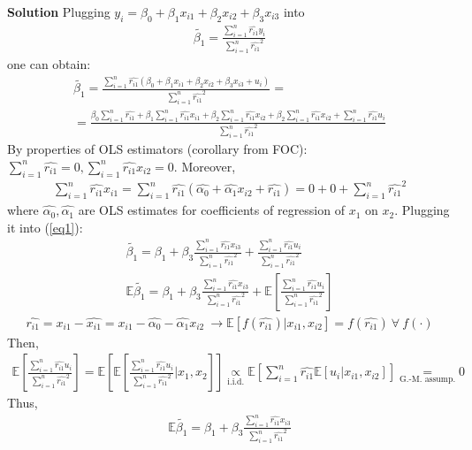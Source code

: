 \documentclass[a4paper]{article}
\newcommand{\expect}{\mathbb{E}}
\begin{document}
\textbf{Solution}
Plugging $y_i = \beta_0 + \beta_1x_{i1} + \beta_2x_{i2}+\beta_3x_{i3}$ into
\begin{align*}
\tilde{\beta_1} = \frac{\sum_{i=1}^n \hat{r_{i1}}y_i}{\sum_{i=1}^n \hat{r_{i1}}^2}
\end{align*}
one can obtain:
\begin{align} \label{eq1}
\tilde{\beta_1} = \frac{\sum_{i=1}^n \hat{r_{i1}}(\beta_0 + \beta_1x_{i1} + \beta_2x_{i2}+\beta_3x_{i3} + u_i)}{\sum_{i=1}^n \hat{r_{i1}}^2} = \nonumber \\
=\frac{\beta_0 \sum_{i=1}^n \hat{r_{i1}} + \beta_1 \sum_{i=1}^n \hat{r_{i1}}x_{i1} + \beta_2 \sum_{i=1}^n \hat{r_{i1}}x_{i2} + \beta_2 \sum_{i=1}^n \hat{r_{i1}}x_{i2} + \sum_{i=1}^n \hat{r_{i1}}u_i}{\sum_{i=1}^n \hat{r_{i1}}^2}
\end{align}
By properties of OLS estimators (corollary from FOC): $\sum_{i=1}^n \hat{r_{i1}} = 0, \sum_{i=1}^n \hat{r_{i1}}x_{i2} = 0$. Moreover,
\begin{align*}
\sum_{i=1}^n \hat{r_{i1}}x_{i1} = \sum_{i=1}^n \hat{r_{i1}} (\hat{\alpha_0} + \hat{\alpha_1}x_{i2} + \hat{r_{i1}}) = 0 + 0 + \sum_{i=1}^n \hat{r_{i1}}^2
\end{align*}
where $\hat{\alpha_0}, \hat{\alpha_1}$ are OLS estimates for coefficients of regression of $x_1$ on $x_2$. Plugging it into (\ref{eq1}):
\begin{align*}
\tilde{\beta_1} = \beta_1 + \beta_3\frac{\sum_{i=1}^n\hat{r_{i1}}x_{i3}}{\sum_{i=1}^n \hat{r_{i1}}^2} + \frac{\sum_{i=1}^n \hat{r_{i1}}u_i}{\sum_{i=1}^n \hat{r_{i1}}^2}\\
\expect \tilde{\beta_1} = \beta_1 + \beta_3\frac{\sum_{i=1}^n\hat{r_{i1}}x_{i3}}{\sum_{i=1}^n \hat{r_{i1}}^2} + \expect\left[ \frac{\sum_{i=1}^n \hat{r_{i1}}u_i}{\sum_{i=1}^n \hat{r_{i1}}^2} \right]
\end{align*}
\begin{align*}
\hat{r_{i1}} = x_{i1} - \hat{x_{i1}} = x_{i1} - \hat{\alpha_0} - \hat{\alpha_1}x_{i2}\ \to \expect[f(\hat{r_{i1}})|x_{i1}, x_{i2}] = f(\hat{r_{i1}}) \ \forall\ f(\cdot)
\end{align*}
Then,
\begin{align*}
\expect\left[\frac{\sum_{i=1}^n \hat{r_{i1}}u_i}{\sum_{i=1}^n \hat{r_{i1}}^2} \right] = \expect\left[\expect\left[\frac{\sum_{i=1}^n \hat{r_{i1}}u_i}{\sum_{i=1}^n \hat{r_{i1}}^2}\bigg|x_{1}, x_{2}\right] \right] \underset{\text{i.i.d.}}{\propto} \expect\left[\sum_{i=1}^n\hat{r_{i1}}\expect [u_i|x_{i1}, x_{i2}]\right] \underset{\text{G.-M. assump.}}{=} 0 
\end{align*}
Thus, 
\begin{align*}
\expect \tilde{\beta_1} = \beta_1 + \beta_3\frac{\sum_{i=1}^n\hat{r_{i1}}x_{i3}}{\sum_{i=1}^n \hat{r_{i1}}^2}
\end{align*}
\end{document}
